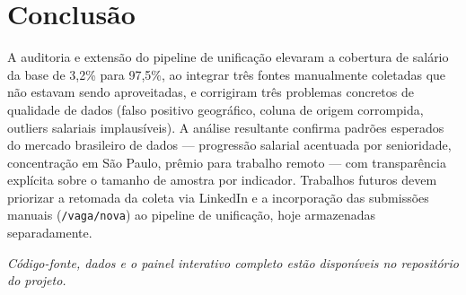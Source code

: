 \documentclass[10pt,twocolumn]{article}
\begin{document}
\section{Conclusão}

A auditoria e extensão do pipeline de unificação elevaram a cobertura de
salário da base de 3,2\% para 97,5\%, ao integrar três fontes manualmente
coletadas que não estavam sendo aproveitadas, e corrigiram três problemas
concretos de qualidade de dados (falso positivo geográfico, coluna de origem
corrompida, outliers salariais implausíveis). A análise resultante confirma
padrões esperados do mercado brasileiro de dados --- progressão salarial
acentuada por senioridade, concentração em São Paulo, prêmio para trabalho
remoto --- com transparência explícita sobre o tamanho de amostra por
indicador. Trabalhos futuros devem priorizar a retomada da coleta via
LinkedIn e a incorporação das submissões manuais (\texttt{/vaga/nova}) ao
pipeline de unificação, hoje armazenadas separadamente.

\vspace{0.5em}
\noindent\textit{Código-fonte, dados e o painel interativo completo estão
disponíveis no repositório do projeto.}
\end{document}
